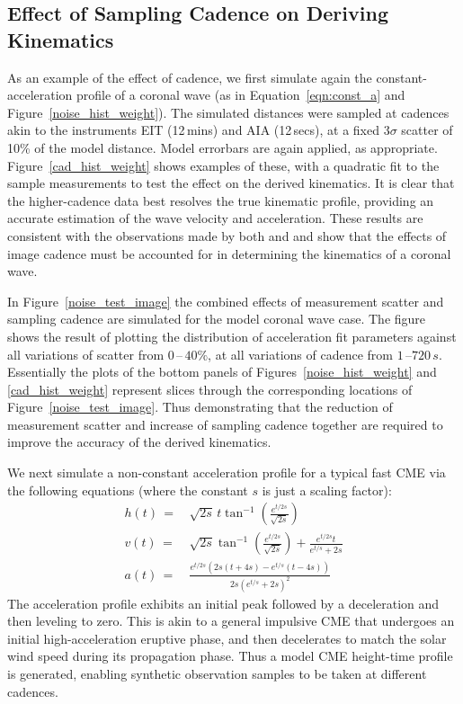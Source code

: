 \documentclass[structabstract]{aa}
\begin{document}
\subsection{Effect of Sampling Cadence on Deriving Kinematics}
\label{subsect:cadence}

As an example of the effect of cadence, we first simulate again the constant-acceleration profile of a coronal wave (as in Equation~\ref{eqn:const_a} and Figure~\ref{noise_hist_weight}). The simulated distances were sampled at cadences akin to the instruments EIT (12\,mins) and AIA (12\,secs), at a fixed $3\sigma$ scatter of 10\% of the model distance. Model errorbars are again applied, as appropriate. Figure~\ref{cad_hist_weight} shows examples of these, with a quadratic fit to the sample measurements to test the effect on the derived kinematics. It is clear that the higher-cadence data best resolves the true kinematic profile, providing an accurate estimation of the wave velocity and acceleration. These results are consistent with the observations made by both \citet{2008ApJ...680L..81L} and \citet{2009ApJ...707..503M} and show that the effects of image cadence must be accounted for in determining the kinematics of a coronal wave.

In Figure~\ref{noise_test_image} the combined effects of measurement scatter and sampling cadence are simulated for the model coronal wave case. The figure shows the result of plotting the distribution of acceleration fit parameters against all variations of scatter from $0$\,--\,$40\%$, at all variations of cadence from $1$\,--$720\,s$. Essentially the plots of the bottom panels of Figures~\ref{noise_hist_weight} and \ref{cad_hist_weight} represent slices through the corresponding locations of Figure~\ref{noise_test_image}. Thus demonstrating that the reduction of measurement scatter and increase of sampling cadence together are required to improve the accuracy of the derived kinematics.

We next simulate a non-constant acceleration profile for a typical fast CME via the following equations (where the constant $s$ is just a scaling factor):
\begin{eqnarray}
h(t)\,=&\,\sqrt{2s}\,t\tan^{-1}\left(\frac{e^{t/2s}}{\sqrt{2s}}\right) \\
v(t)\,=&\,\sqrt{2s}\tan^{-1}\left(\frac{e^{t/2s}}{\sqrt{2s}}\right)+\frac{e^{t/2s}t}{e^{t/s}+2s} \\
a(t)\,=&\,\frac{e^{t/2s}\left(2s\left(t+4s\right)-e^{t/s}\left(t-4s\right)\right)}{2s\left(e^{t/s}+2s\right)^2}
\label{eqn:nonconst_a}
\end{eqnarray}
The acceleration profile exhibits an initial peak followed by a deceleration and then leveling to zero. This is akin to a general impulsive CME that undergoes an initial high-acceleration eruptive phase, and then decelerates to match the solar wind speed during its propagation phase. Thus a model CME height-time profile is generated, enabling synthetic observation samples to be taken at different cadences. 
\end{document}
